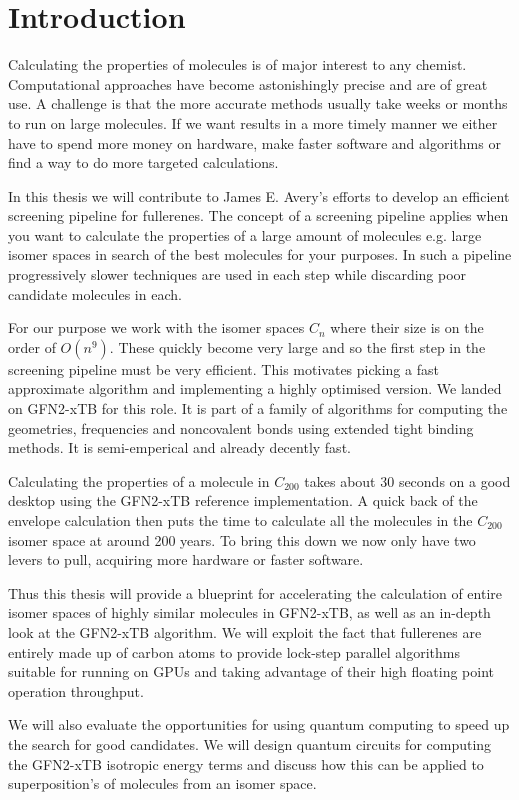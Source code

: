 \chapter{Introduction}
Calculating the properties of molecules is of major interest to any chemist. Computational approaches have become astonishingly precise and are of great use. A challenge is that the more accurate methods usually take weeks or months to run on large molecules. If we want results in a more timely manner we either have to spend more money on hardware, make faster software and algorithms or find a way to do more targeted calculations. 

In this thesis we will contribute to James E. Avery's efforts to develop an efficient screening pipeline for fullerenes. The concept of a screening pipeline applies when you want to calculate the properties of a large amount of molecules e.g. large isomer spaces in search of the best molecules for your purposes. In such a pipeline progressively slower techniques are used in each step while discarding poor candidate molecules in each. 

For our purpose we work with the isomer spaces $C_n$ where their size is on the order of $O(n^9)$.
These quickly become very large and so the first step in the screening pipeline must be very efficient. This motivates picking a fast approximate algorithm and implementing a highly optimised version.
We landed on GFN2-xTB for this role. It is part of a family of algorithms for computing the geometries, frequencies and noncovalent bonds using extended tight binding methods. It is semi-emperical and already decently fast. 

Calculating the properties of a molecule in $C_200$ takes about 30 seconds on a good desktop using the GFN2-xTB reference implementation. A quick back of the envelope calculation then puts the time to calculate all the molecules in the $C_200$ isomer space at around 200 years. To bring this down we now only have two levers to pull, acquiring more hardware or faster software. 

Thus this thesis will provide a blueprint for accelerating the calculation of entire isomer spaces of highly similar molecules in GFN2-xTB, as well as an in-depth look at the GFN2-xTB algorithm. We will exploit the fact that fullerenes are entirely made up of carbon atoms to provide lock-step parallel algorithms suitable for running on GPUs and taking advantage of their high floating point operation throughput.

We will also evaluate the opportunities for using quantum computing to speed up the search for good candidates. We will design quantum circuits for computing the GFN2-xTB isotropic energy terms and discuss how this can be applied to superposition's of molecules from an isomer space. 

